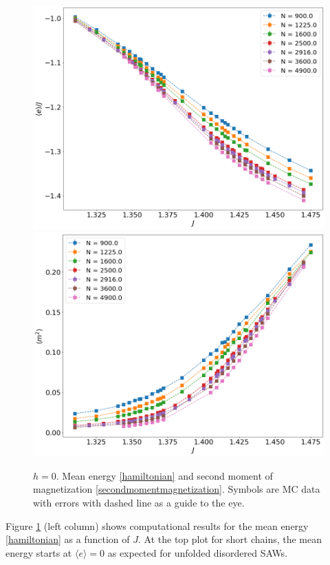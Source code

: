 \begin{figure}[!ht]
	\includegraphics[scale=0.23]{Images/energy_longchains.png}
	\includegraphics[scale=0.23]{Images/magnetization2_longchains.png}
	\caption{$h=0$. Mean energy \eqref{hamiltonian} and   second moment of magnetization \eqref{secondmomentmagnetization}. Symbols are MC data with errors with dashed line as a guide to the eye. }
	\label{fig:energymagshort}
\end{figure}

 Figure \ref{fig:energymagshort} (left column) shows computational results for the mean energy  \eqref{hamiltonian} as a function of $J$. At the top plot for short chains, the mean energy starts at $\langle e \rangle = 0$ as expected for unfolded disordered SAWs. %
 
